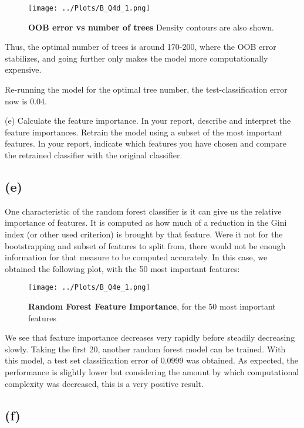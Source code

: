 \documentclass[12pt]{report} %
\begin{document}
\begin{figure}[htbp]
    \centering
    \texttt{[image: ../Plots/B\_Q4d\_1.png]}
    \caption{\textbf{OOB error vs number of trees} Density contours are also shown.}
\end{figure}

Thus, the optimal number of trees is around 170-200, where the OOB error stabilizes, and going further only makes the model more computationally expensive.

Re-running the model for the optimal tree number, the test-classification error now is 0.04.


(e) Calculate the feature importance. In your report, describe and interpret the feature importances. Retrain the model using a subset of the most important features. In your report, indicate which features you have chosen and compare the retrained classifier with the original classifier.


\subsection*{(e)}

One characteristic of the random forest classifier is it can give us the relative importance of features. It is computed as how much of a reduction in the Gini index (or other used criterion) is brought by that feature. Were it not for the bootstrapping and subset of features to split from, there would not be enough information for that measure to be computed accurately\cite[pp. 345-346]{james2013introduction}. In this case, we obtained the following plot, with the 50 most important features:

\begin{figure}[htbp]
    \centering
    \texttt{[image: ../Plots/B\_Q4e\_1.png]}
    \caption{\textbf{Random Forest Feature Importance}, for the 50 most important features}
\end{figure}

We see that feature importance decreases very rapidly before steadily decreasing slowly. Taking the first 20, another random forest model can be trained. With this model, a test set classification error of 0.0999 was obtained. As expected, the performance is slightly lower but considering the amount by which computational complexity was decreased, this is a very positive result.


\subsection*{(f)}
\end{document}
